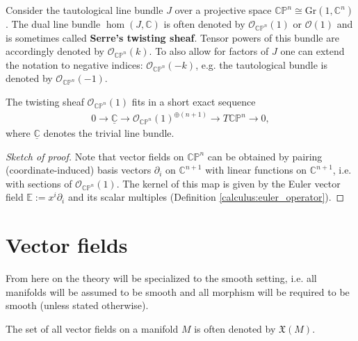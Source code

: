     \begin{definition}
        Consider the tautological line bundle $J$ over a projective space $\mathbb{C}\mathbb{P}^n\cong\mathrm{Gr}(1,\mathbb{C}^n)$. The dual line bundle $\hom(J,\mathbb{C})$ is often denoted by $\mathcal{O}_{\mathbb{CP}^n}(1)$ or $\mathcal{O}(1)$ and is sometimes called \textbf{Serre's twisting sheaf}. Tensor powers of this bundle are accordingly denoted by $\mathcal{O}_{\mathbb{CP}^n}(k)$. To also allow for factors of $J$ one can extend the notation to negative indices: $\mathcal{O}_{\mathbb{CP}^n}(-k)$, e.g. the tautological bundle is denoted by $\mathcal{O}_{\mathbb{CP}^n}(-1)$.
    \end{definition}

    \begin{property}
        The twisting sheaf $\mathcal{O}_{\mathbb{CP}^n}(1)$ fits in a short exact sequence
        \begin{gather}
            0\longrightarrow\underline{\mathbb{C}}\longrightarrow\mathcal{O}_{\mathbb{CP}^n}(1)^{\oplus(n+1)}\longrightarrow T\mathbb{CP}^n\longrightarrow0,
        \end{gather}
        where $\underline{\mathbb{C}}$ denotes the trivial line bundle.
        \begin{proof}[Sketch of proof]
            Note that vector fields on $\mathbb{CP}^n$ can be obtained by pairing (coordinate-induced) basis vectors $\partial_i$ on $\mathbb{C}^{n+1}$ with linear functions on $\mathbb{C}^{n+1}$, i.e. with sections of $\mathcal{O}_{\mathbb{CP}^n}(1)$. The kernel of this map is given by the Euler vector field $\mathbb{E}:=x^i\partial_i$ and its scalar multiples (Definition \ref{calculus:euler_operator}).
        \end{proof}
    \end{property}

\section{Vector fields}

    From here on the theory will be specialized to the smooth setting, i.e. all manifolds will be assumed to be smooth and all morphism will be required to be smooth (unless stated otherwise).

    \begin{notation}
        The set of all vector fields on a manifold $M$ is often denoted by $\mathfrak{X}(M)$.
    \end{notation}

